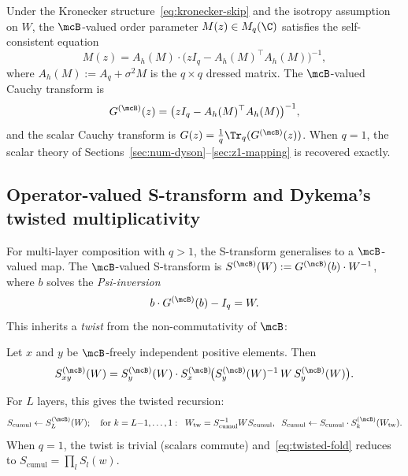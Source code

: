 \begin{proposition}\label{prop:kronecker-collapse}
Under the Kronecker structure~\eqref{eq:kronecker-skip} and the isotropy assumption on $W$, the $\mcB$-valued order parameter $M(z) \in M_q(\C)$ satisfies the self-consistent equation
\begin{equation}\label{eq:matrix-dyson}
M(z) = A_h(M) \cdot \bigl(zI_q - A_h(M)^\top A_h(M)\bigr)^{-1},
\end{equation}
where $A_h(M) := A_q + \sigma^2 M$ is the $q \times q$ dressed matrix. The $\mcB$-valued Cauchy transform is
\begin{equation}\label{eq:G-B}
G^{(\mcB)}(z) = \bigl(zI_q - A_h(M)^\top A_h(M)\bigr)^{-1},
\end{equation}
and the scalar Cauchy transform is $G(z) = \frac{1}{q}\Tr_q(G^{(\mcB)}(z))$. When $q = 1$, the scalar theory of Sections~\ref{sec:num-dyson}--\ref{sec:z1-mapping} is recovered exactly.
\end{proposition}

\subsection{Operator-valued S-transform and Dykema's twisted multiplicativity}\label{sec:ov-s-transform}

For multi-layer composition with $q > 1$, the S-transform generalises to a $\mcB$-valued map. The $\mcB$-valued S-transform is $S^{(\mcB)}(W) := G^{(\mcB)}(b) \cdot W^{-1}$, where $b$ solves the \emph{Psi-inversion}
\begin{equation}\label{eq:psi-inversion}
b \cdot G^{(\mcB)}(b) - I_q = W.
\end{equation}
This inherits a \emph{twist} from the non-commutativity of $\mcB$:

\begin{theorem}[Dykema, 2006]\label{thm:dykema}
Let $x$ and $y$ be $\mcB$-freely independent positive elements. Then
\begin{equation}\label{eq:twisted-mult}
S^{(\mcB)}_{xy}(W) = S^{(\mcB)}_y(W) \cdot S^{(\mcB)}_x\!\bigl(S^{(\mcB)}_y(W)^{-1} \, W \, S^{(\mcB)}_y(W)\bigr).
\end{equation}
\end{theorem}

\noindent For $L$ layers, this gives the twisted recursion:
\begin{equation}\label{eq:twisted-fold}
S_{\mathrm{cumul}} \leftarrow S^{(\mcB)}_L(W); \quad \text{for } k = L{-}1, \ldots, 1: \;\; W_{\mathrm{tw}} = S_{\mathrm{cumul}}^{-1} W S_{\mathrm{cumul}}, \;\; S_{\mathrm{cumul}} \leftarrow S_{\mathrm{cumul}} \cdot S^{(\mcB)}_k(W_{\mathrm{tw}}).
\end{equation}
When $q = 1$, the twist is trivial (scalars commute) and~\eqref{eq:twisted-fold} reduces to $S_{\mathrm{cumul}} = \prod_l S_l(w)$.

